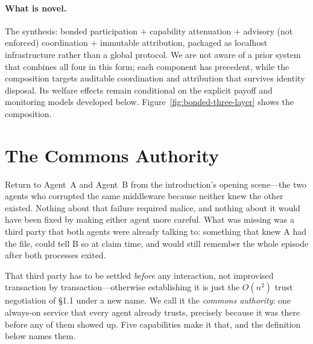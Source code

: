 \documentclass[11pt,a4paper]{article}
\theoremstyle{definition}
\theoremstyle{remark}
\begin{document}
\paragraph{What is novel.} The synthesis: bonded participation $+$ capability attenuation $+$ advisory (not enforced) coordination $+$ immutable attribution, packaged as localhost infrastructure rather than a global protocol. We are not aware of a prior system that combines all four in this form; each component has precedent, while the composition targets auditable coordination and attribution that survives identity disposal. Its welfare effects remain conditional on the explicit payoff and monitoring models developed below. Figure~\ref{fig:bonded-three-layer} shows the composition.



\section{The Commons Authority}\label{sec:commons}

Return to Agent~A and Agent~B from the introduction's opening scene---the two agents who corrupted the same middleware because neither knew the other existed. Nothing about that failure required malice, and nothing about it would have been fixed by making either agent more careful. What was missing was a third party that both agents were already talking to: something that knew A had the file, could tell B so at claim time, and would still remember the whole episode after both processes exited.

That third party has to be settled \emph{before} any interaction, not improvised transaction by transaction---otherwise establishing it is just the $O(n^2)$ trust negotiation of \S1.1 under a new name. We call it the \emph{commons authority}: one always-on service that every agent already trusts, precisely because it was there before any of them showed up. Five capabilities make it that, and the definition below names them.
\end{document}
